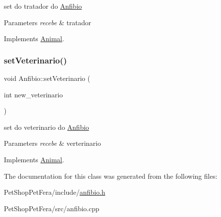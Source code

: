 set do tratador do \mbox{\hyperlink{class_anfibio}{Anfibio}} 


\begin{DoxyParams}{Parameters}
{\em recebe} & tratador \\
\hline
\end{DoxyParams}


Implements \mbox{\hyperlink{class_animal}{Animal}}.

\mbox{\label{class_anfibio_ac1c7753e922600d12853f5209e65bfbc}} 
\subsubsection{\texorpdfstring{setVeterinario()}{setVeterinario()}}
{\footnotesize\ttfamily void Anfibio\+::set\+Veterinario (\begin{DoxyParamCaption}\item[{int}]{new\+\_\+veterinario }\end{DoxyParamCaption})\hspace{0.3cm}{\ttfamily [virtual]}}



set do veterinario do \mbox{\hyperlink{class_anfibio}{Anfibio}} 


\begin{DoxyParams}{Parameters}
{\em recebe} & verterinario \\
\hline
\end{DoxyParams}


Implements \mbox{\hyperlink{class_animal}{Animal}}.



The documentation for this class was generated from the following files\+:\begin{DoxyCompactItemize}
\item 
Pet\+Shop\+Pet\+Fera/include/\mbox{\hyperlink{anfibio_8h}{anfibio.\+h}}\item 
Pet\+Shop\+Pet\+Fera/src/anfibio.\+cpp\end{DoxyCompactItemize}
